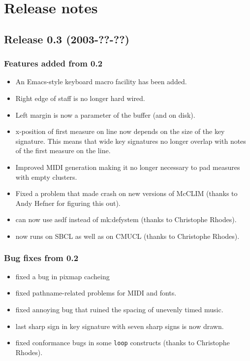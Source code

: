 \chapter{Release notes}

\section{Release 0.3 (2003-??-??)}

\subsection{Features added from 0.2}

\begin{itemize}
\item An Emacs-style keyboard macro facility has been added. 
\item Right edge of staff is no longer hard wired.
\item Left margin is now a parameter of the buffer (and on disk).
\item x-position of first measure on line now depends on the size of
  the key signature.  This means that wide key signatures no longer
  overlap with notes of the first measure on the line.
\item Improved MIDI generation making it no longer necessary to pad 
measures with empty clusters.
\item Fixed a problem that made {\gs} crash on new versions of
  McCLIM (thanks to Andy Hefner for figuring this out). 
\item {\gs} can now use asdf instead of mk:defystem (thanks to
  Christophe Rhodes).
\item {\gs} now runs on SBCL as well as on CMUCL (thanks to Christophe
  Rhodes).
\end{itemize}

\subsection{Bug fixes from 0.2}

\begin{itemize}
\item fixed a bug in pixmap cacheing
\item fixed pathname-related problems for MIDI and fonts. 
\item fixed annoying bug that ruined the spacing of unevenly timed
  music. 
\item last sharp sign in key signature with seven sharp signs is now
  drawn. 
\item fixed conformance bugs in some \texttt{loop} constructs (thanks to
  Christophe Rhodes).
\end{itemize}

